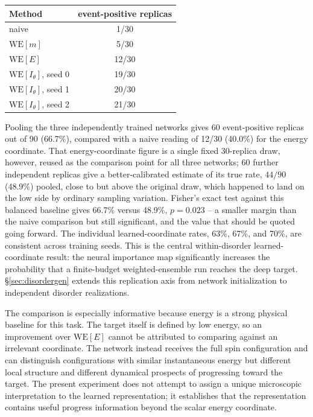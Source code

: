 \documentclass[a4paper,fleqn]{cas-sc}
\newcommand{\WE}{\mathrm{WE}}
\begin{document}
\begin{center}
\begin{minipage}{0.70\linewidth}
\centering
{}
\label{tab:deep}
\begin{tabular}{lc}
\toprule
Method & event-positive replicas \\
\midrule
naive & 1/30 \\
$\WE[m]$ & 5/30 \\
$\WE[E]$ & 12/30 \\
$\WE[I_\theta]$, seed 0 & 19/30 \\
$\WE[I_\theta]$, seed 1 & 20/30 \\
$\WE[I_\theta]$, seed 2 & 21/30 \\
\bottomrule
\end{tabular}
\end{minipage}
\end{center}

Pooling the three independently trained networks gives 60 event-positive replicas out of 90 (66.7\%), compared with a naive reading of 12/30 (40.0\%) for the energy coordinate. That energy-coordinate figure is a single fixed 30-replica draw, however, reused as the comparison point for all three networks; 60 further independent replicas give a better-calibrated estimate of its true rate, $44/90$ (48.9\%) pooled, close to but above the original draw, which happened to land on the low side by ordinary sampling variation. Fisher's exact test against this balanced baseline gives 66.7\% versus 48.9\%, $p=0.023$ -- a smaller margin than the naive comparison but still significant, and the value that should be quoted going forward. The individual learned-coordinate rates, 63\%, 67\%, and 70\%, are consistent across training seeds. This is the central within-disorder learned-coordinate result: the neural importance map significantly increases the probability that a finite-budget weighted-ensemble run reaches the deep target. \S\ref{sec:disordergen} extends this replication axis from network initialization to independent disorder realizations.

The comparison is especially informative because energy is a strong physical baseline for this task. The target itself is defined by low energy, so an improvement over $\WE[E]$ cannot be attributed to comparing against an irrelevant coordinate. The network instead receives the full spin configuration and can distinguish configurations with similar instantaneous energy but different local structure and different dynamical prospects of progressing toward the target. The present experiment does not attempt to assign a unique microscopic interpretation to the learned representation; it establishes that the representation contains useful progress information beyond the scalar energy coordinate.
\end{document}
